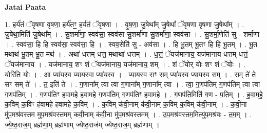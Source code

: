 \documentclass[17pt]{extarticle}
\begin{document}
\textbf{Jatai Paata} \newline

1. हर्य॑तं ॅवृषणा वृषणा॒ हर्य॑तꣳ॒॒ हर्य॑तं ॅवृषणा । . वृ॒ष॒णा॒ जु॒षेथा᳚म् जु॒षेथां᳚ ॅवृषणा वृषणा जु॒षेथा᳚म् । . जु॒षेथा॒मिति॑ जु॒षेथा᳚म् । . सु॒शर्मा॑णा॒ स्वव॑सा॒ स्वव॑सा सु॒शर्मा॑णा सु॒शर्मा॑णा॒ स्वव॑सा । . सु॒शर्मा॒णेति॑ सु - शर्मा॑णा । . स्वव॑सा॒ हि हि स्वव॑सा॒ स्वव॑सा॒ हि । . स्वव॒सेति॑ सु - अव॑सा । . हि भू॒तम् भू॒तꣳ हि हि भू॒तम् । . भू॒त मथाथ॑ भू॒तम् भू॒त मथ॑ । . अथा॑ धत्तम् धत्त॒ मथाथा॑ धत्तम् । . ध॒त्तं॒ ॅयज॑मानाय॒ यज॑मानाय धत्तम् धत्तं॒ ॅयज॑मानाय । . यज॑मानाय॒ शꣳ शं ॅयज॑मानाय॒ यज॑मानाय॒ शम् । . शं ॅयोर् योः शꣳ शं ॅयोः । . योरिति॒ योः । . आ प्या॑यस्व प्याय॒स्वा प्या॑यस्व । . प्या॒य॒स्व॒ सꣳ सम् प्या॑यस्व प्यायस्व॒ सम् । . सम् ते॑ ते॒ सꣳ सम् ते᳚ । . त॒ इति॑ ते । . ग॒णाना᳚म् त्वा त्वा ग॒णाना᳚म् ग॒णाना᳚म् त्वा । . त्वा॒ ग॒णप॑तिम् ग॒णप॑तिम् त्वा त्वा ग॒णप॑तिम् । . ग॒णप॑तिꣳ हवामहे हवामहे ग॒णप॑तिम् ग॒णप॑तिꣳ हवामहे । . ग॒णप॑ति॒मिति॑ ग॒ण - प॒ति॒म् । . ह॒वा॒म॒हे॒ क॒विम् क॒विꣳ ह॑वामहे हवामहे क॒विम् । . क॒विम् क॑वी॒नाम् क॑वी॒नाम् क॒विम् क॒विम् क॑वी॒नाम् । . क॒वी॒ना मु॑प॒मश्र॑वस्तम मुप॒मश्र॑वस्तमम् कवी॒नाम् क॑वी॒ना मु॑प॒मश्र॑वस्तमम् । . उ॒प॒मश्र॑वस्तम॒मित्यु॑प॒मश्र॑वः - त॒म॒म् । . ज्ये॒ष्ठ॒राज॒म् ब्रह्म॑णा॒म् ब्रह्म॑णाम् ज्येष्ठ॒राज॑म् ज्येष्ठ॒राज॒म् ब्रह्म॑णाम् । \newline
\end{document}
